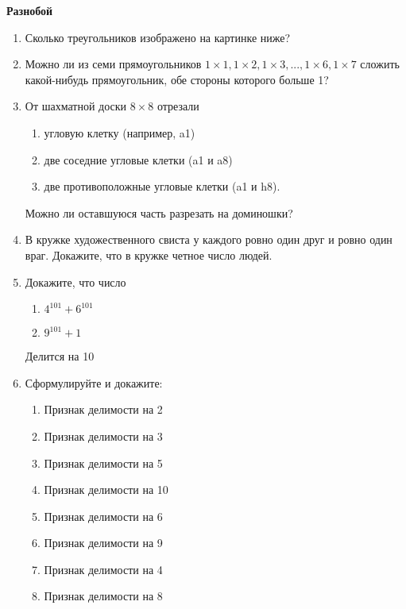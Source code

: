 \documentclass{article}
\begin{document}
\large
	
\begin{center}
	\textbf{Разнобой}
\end{center}


\begin{enumerate}[label*=\protect\fbox{\arabic{enumi}}]
	
\item Сколько треугольников изображено на картинке ниже?

\item Можно ли из семи прямоугольников $1 \times1, 1 \times2, 1 \times3, ..., 1 \times6, 1 \times7$ сложить какой-нибудь прямоугольник, обе стороны которого больше 1?

\item От шахматной доски $8 \times 8$ отрезали 
\begin{enumerate}
	\item угловую клетку (например, a1)
	
	\item две соседние угловые клетки (a1 и a8) 
	
	\item две противоположные угловые клетки (a1 и h8). 
\end{enumerate}

Можно ли оставшуюся часть разрезать на доминошки?

\item В кружке художественного свиста у каждого ровно один друг и ровно один враг. Докажите, что в кружке четное число людей.

\item Докажите, что число 

\begin{enumerate}
	\item $4^{101} + 6^{101}$
	
	\item $9^{101} + 1$ 
\end{enumerate}

Делится на 10

\item Сформулируйте и докажите:

\begin{enumerate}
	\item Признак делимости на 2
	
	\item Признак делимости на 3
	
	\item Признак делимости на 5
	
	\item Признак делимости на 10
	
	\item Признак делимости на 6
	
	\item Признак делимости на 9
	
	\item Признак делимости на 4
	
	\item Признак делимости на 8
\end{enumerate}


\end{enumerate}
\end{document}
